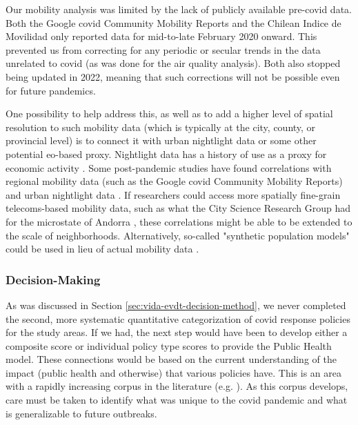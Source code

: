 Our mobility analysis was limited by the lack of publicly available pre-covid data. Both the Google \ac{covid} Community Mobility Reports \cite{googleCOVID19CommunityMobility} and the Chilean Indice de Movilidad \cite{ministeriodecienciatecnologiaconocimientoeinnovacionDatosCOVID192021} only reported data for mid-to-late February 2020 onward. This prevented us from correcting for any periodic or secular trends in the data unrelated to \ac{covid} (as was done for the air quality analysis). Both also stopped being updated in 2022, meaning that such corrections will not be possible even for future pandemics. 

One possibility to help address this, as well as to add a higher level of spatial resolution to such mobility data (which is typically at the city, county, or provincial level) is to connect it with urban nightlight data or some other potential \ac{eo}-based proxy. Nightlight data has a history of use as a proxy for economic activity \cite{delvalleMangrovesProtectCoastal2020}. Some post-pandemic studies have found correlations with regional mobility data (such as the Google \ac{covid} Community Mobility Reports) and urban nightlight data \cite{schweikertMobilityNightlightsAir2022}. If researchers could access more spatially fine-grain telecoms-based mobility data, such as what the City Science Research Group had for the microstate of Andorra \cite{doorleyMobilityCOVID19Andorra2022}, these correlations might be able to be extended to the scale of neighborhoods. Alternatively, so-called "synthetic population models" could be used in lieu of actual mobility data \cite{akbarpourSocioeconomicNetworkHeterogeneity2020}.

\subsubsection{Decision-Making}

As was discussed in Section \ref{sec:vida-evdt-decision-method}, we never completed the second, more systematic quantitative categorization of \ac{covid} response policies for the study areas. If we had, the next step would have been to develop either a composite score or individual policy type scores to provide the Public Health model. These connections would be based on the current understanding of the impact (public health and otherwise) that various policies have. This is an area with a rapidly increasing corpus in the literature (e.g. \cite{bennettAllThingsEqual2021, wibbensWhichCOVIDPolicies2020, dergiadesEffectivenessGovernmentPolicies2020}). As this corpus develops, care must be taken to identify what was unique to the \ac{covid} pandemic and what is generalizable to future outbreaks.

